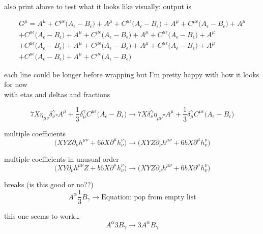 \documentclass{article}
\def\){\Big)}
\def\({\Big(}
\begin{document}
also print above to test what it looks like visually: output is

\begin{multline}
G^{\mu} = A^{\mu} + C^{\mu \epsilon} \( A_{\epsilon} - B_{\epsilon} \)+ A^{\mu} + C^{\mu \epsilon} \( A_{\epsilon} - B_{\epsilon} \)+ A^{\mu} + C^{\mu \epsilon} \( A_{\epsilon} - B_{\epsilon} \)+ A^{\mu} \\
+ C^{\mu \epsilon} \( A_{\epsilon} - B_{\epsilon} \)+ A^{\mu} + C^{\mu \epsilon} \( A_{\epsilon} - B_{\epsilon} \)+ A^{\mu} + C^{\mu \epsilon} \( A_{\epsilon} - B_{\epsilon} \)+ A^{\mu} \\
+ C^{\mu \epsilon} \( A_{\epsilon} - B_{\epsilon} \)+ A^{\mu} + C^{\mu \epsilon} \( A_{\epsilon} - B_{\epsilon} \)+ A^{\mu} + C^{\mu \epsilon} \( A_{\epsilon} - B_{\epsilon} \)+ A^{\mu} \\
+ C^{\mu \epsilon} \( A_{\epsilon} - B_{\epsilon} \)+ A^{\mu} + C^{\mu \epsilon} \( A_{\epsilon} - B_{\epsilon} \)
\end{multline}

each line could be longer before wrapping but I'm pretty happy with how it looks for now\\

with etas and deltas and fractions

\begin{equation}
7X\eta_{\mu \nu} \delta_{\nu}^{\gamma}\square A^{\mu} + \frac{1}{3}\delta_{\mu}^{\gamma}C^{\mu \epsilon}\(A_{\epsilon} - B_{\epsilon}\) 
\rightarrow
7 X \delta_{\nu}^{\gamma} \eta_{\mu \nu} \square A^{\mu} +\frac{1}{3} \delta_{\mu}^{\gamma} C^{\mu \epsilon} \( A_{\epsilon} - B_{\epsilon} \)
\end{equation}


multiple coefficients 
\begin{equation}
\(XY Z \partial_{\nu}h^{\mu \nu} + 6bX \partial^{\mu} h^{\nu }_{\nu}\) 
\rightarrow
\(XY Z \partial_{\nu}h^{\mu \nu} +6 bX \partial^{\mu}h_{\nu}^{\nu} \)
\end{equation}

multiple coefficients in unusual order
\begin{equation}
\(XY \partial_{\nu}h^{\mu \nu}Z + b6X \partial^{\mu} h^{\nu }_{\nu}\) 
\rightarrow
\(XY Z \partial_{\nu}h^{\mu \nu} +6 bX \partial^{\mu}h_{\nu}^{\nu} \)
\end{equation}



{\color{red}
breaks (is this good or no??)
\begin{equation}
A^{\alpha}\frac{1}{3}B_{\gamma} \rightarrow \textrm{
Equation: pop from empty list}
\end{equation}

this one seems to work…
\begin{equation}
A^{\alpha}3B_{\gamma} \rightarrow 
 3 A^{\alpha} B_{\gamma}
 \end{equation}
 }
\end{document}
